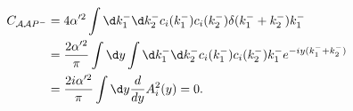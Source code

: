 \begin{equation}
\begin{split}
C_{{\cal A}{\cal A}P^-}&= 4\alpha^{\prime 2}
\int \d k_1^{-} \d k_2^- 
c_i(k^-_1)c_i(k^-_2)
\delta(k_1^- + k_2^-) k^-_1\\
&= \frac{2\alpha^{\prime 2}}{\pi}
\int \d y \int \d k_1^{-} \d k^-_2
c_i(k^-_1)c_i(k^-_2)k^-_1e^{-iy(k^-_1+k^-_2)}\\
&=\frac{2i\alpha^{\prime 2}}{\pi}\int \d y
\frac{d}{d y}A^2_i(y)=0.
\end{split}
\end{equation}

